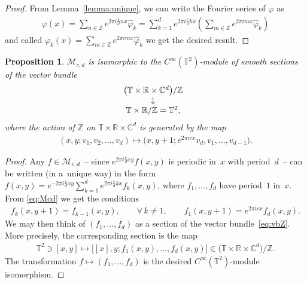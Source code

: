 \documentclass[10pt,a4paper]{amsart}
\numberwithin{equation}{section}
\newtheorem{prop}[thm]{Proposition}
\theoremstyle{definition}
\newcommand{\R}{\mathbb{R}}
\newcommand{\C}{\mathbb{C}}
\newcommand{\Z}{\mathbb{Z}}
\newcommand{\T}{\mathbb{T}}
\begin{document}
\begin{proof}
From Lemma~\ref{lemma:unique},
we can write the Fourier series of $\varphi$ as
\begin{gather*}
\varphi(x)=
\sum_{n\in\Z}e^{2\pi i\frac{1}{d}nx}\hat\varphi_k
=\sum_{k=1}^de^{2\pi i\frac{c}{d}kx}\left(\sum_{m\in\Z}e^{2\pi imx}\hat\varphi_k\right)
\end{gather*}
and called $\varphi_k(x)=\sum\limits_{m\in\Z}e^{2\pi imx}\hat\varphi_k$ we get the desired result.
\end{proof}

\begin{prop}
$\mathcal{M}_{c,d}$ is isomorphic to the $C^\infty(\T^2)$-module of smooth sections of the vector bundle
\begin{gather}\label{eq:vbZ}
\begin{array}{@{}c}
\big(\T\times\R\times\C^d\big)/\Z
\\
\downarrow
\\
\T\times\R/\Z=\T^2,
\end{array}
\end{gather}
where the action of $\Z$ on $\T\times\R\times\C^d$ is generated by the map
\begin{gather*}
(x,y;v_1,v_2,\ldots,v_d)\mapsto
\big(x,y+1;e^{2\pi icx}v_d,v_1,\ldots,v_{d-1}\big) .
\end{gather*}
\end{prop}

\begin{proof}
Any $f\in\mathcal{M}_{c,d}$~-- since $e^{2\pi i\frac{c}{d}xy}f(x,y)$ is periodic in~$x$ with period~$d$~-- can be written (in a~unique way) in the form $f(x,y)=e^{-2\pi i\frac{c}{d}xy}\sum\limits_{k=1}^de^{2\pi i\frac{c}{d}kx}f_k(x,y)$, where $f_1,\ldots,f_d$ have period~$1$ in~$x$.
From \eqref{eq:Mcd} we get the conditions
\begin{gather*}
f_k(x,y+1)=f_{k-1}(x,y) ,\qquad\forall\, k\neq 1,
\qquad
f_1(x,y+1)=e^{2\pi icx}f_d(x,y) .
\end{gather*}
We may then think of $(f_1,\ldots,f_d)$ as a section of the vector bundle~\eqref{eq:vbZ}.
More precisely, the corresponding section is the map
\begin{gather*}
\T^2\ni [x,y]\mapsto \big[[x],y;f_1(x,y),\ldots,f_d(x,y)\big] \in \big(\T\times\R\times\C^d\big)/\Z.
\end{gather*}
The transformation $f\mapsto (f_1,\ldots,f_d)$ is the desired $C^\infty(\T^2)$-module isomorphism.
\end{proof}
\end{document}
